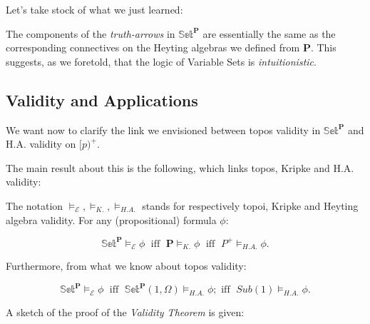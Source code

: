 Let's take stock of what we just learned:

\begin{remark}
	The components of the \emph{truth-arrows} in $\mathbb{Set}^\textbf{P}$ are essentially the same as the corresponding connectives on the Heyting algebras we defined from \textbf{P}. \newline
	This suggests, as we foretold, that the logic of Variable Sets is \emph{intuitionistic}.  
\end{remark}

\newpage
\subsection{Validity and Applications}

We want now to clarify the link we envisioned between topos validity in $\mathbb{Set}^\textbf{P}$ and H.A. validity on $[p)^+$. \newline

The main result about this is the following, which links topos, Kripke and H.A. validity:
\begin{thm}
	The notation $ \models_{\mathcal{E}}, \models_{K.}, \models_{H.A.}$ stands for respectively topoi, Kripke and Heyting algebra validity. \newline
	For any (propositional) formula $\phi$:
	
	\begin{equation*}
		\mathbb{Set}^\textbf{P}  \models_{\mathcal{E}} \phi\; \text{ iff } \;\textbf{P} \models_{K.} \phi\; \text{ iff } \; P^+ \models_{H.A.} \phi.  
	\end{equation*}

\end{thm}

Furthermore, \newline from what we know about topos validity:

\begin{prop}
	
	\begin{equation*}
		\mathbb{Set}^\textbf{P}  \models_{\mathcal{E}} \phi\; \text{ iff } \;\mathbb{Set}^\textbf{P}(1,\Omega)  \models_{H.A.} \phi; \text{ iff } \; Sub(1) \models_{H.A.} \phi.  
	\end{equation*}

\end{prop}

A sketch of the proof of the \emph{Validity Theorem} is given:


